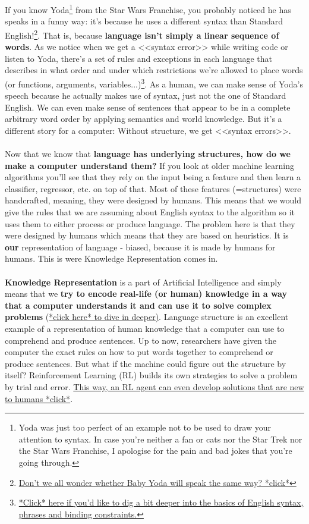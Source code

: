 \documentclass{article}
\begin{document}
If you know Yoda\footnote{Yoda was just too perfect of an example not to be used to draw your attention to syntax. In case you're neither a fan or cats nor the Star Trek nor the Star Wars Franchise, I apologise for the pain and bad jokes that you're going through.} from the Star Wars Franchise, you probably noticed he has speaks in a funny way: it's because he uses a different syntax than Standard English!\footnote{\href{https://slate.com/technology/2019/12/baby-yoda-first-words-linguistics.html}{Don't we all wonder whether Baby Yoda will speak the same way? *click*}}. That is, because \textbf{language isn't simply a linear sequence of words}. As we notice when we get a <<syntax error>> while writing code or listen to Yoda, there's a set of rules and exceptions in each language that describes in what order and under which restrictions we're allowed to place words (or functions, arguments, variables...)\footnote{\href{https://www.youtube.com/watch?v=n9168PgGHBc}{*Click* here if you'd like to dig a bit deeper into the basics of English syntax, phrases and binding constraints.}}. As a human, we can make sense of Yoda's speech because he actually makes use of syntax, just not the one of Standard English. We can even make sense of sentences that appear to be in a complete arbitrary word order by applying semantics and world knowledge. But it's a different story for a computer: Without structure, we get <<syntax errors>>. \\\\  
Now that we know that \textbf{language has underlying structures, how do we make a computer understand them?} If you look at older machine learning algorithms you'll see that they rely on the input being a feature and then learn a classifier, regressor, etc. on top of that. Most of these features (=structures) were handcrafted, meaning, they were designed by humans. This means that we would give the rules that we are assuming about English syntax to the algorithm so it uses them to either process or produce language. The problem here is that they were designed by humans which means that they are based on heuristics. It is \textbf{our} representation of language - biased, because it is made by humans for humans. This is were Knowledge Representation comes in.\\\\
\textbf{Knowledge Representation} is a part of Artificial Intelligence and simply means that we \textbf{try to encode real-life (or human) knowledge in a way that a computer understands it and can use it to solve complex problems} (\href{http://www.deeplearningbook.org/contents/representation.html}{*click here* to dive in deeper)}. Language structure is an excellent example of a representation of human knowledge that a computer can use to comprehend and produce sentences. Up to now, researchers have given the computer the exact rules on how to put words together to comprehend or produce sentences. But what if the machine could figure out the structure by itself? Reinforcement Learning (RL) builds its own strategies to solve a problem by trial and error. \href{https://www.wired.com/2016/03/two-moves-alphago-lee-sedol-redefined-future/}{This way, an RL agent can even develop solutions that are new to humans *click*}.
\end{document}
